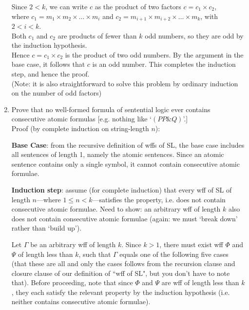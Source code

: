 \documentclass[12pt]{article}
\begin{document}
\begin{enumerate}
Since $2 < k$, we can write $c$ as the product of two factors $c = c_1 \times c_2$, \\
where $c_1 = m_1 \times m_2 \times \ldots \times m_i$ and  $c_2 = m_{i+1} \times m_{i+2} \times \ldots \times m_k$, with $2<i<k$.\\

Both $c_1$ and $c_2$ are products of fewer than $k$ odd numbers, so they are odd by the induction hypothesis.\\

Hence $c = c_1 \times c_2$ is the product of two odd numbers. By the argument in the base case, it follows that $c$ is an odd number. This completes the induction step, and hence the proof. \\

(Note: it is also straightforward to solve this problem by ordinary induction on the number of odd factors)

\newpage

\item Prove that no well-formed formula of sentential logic ever contains consecutive atomic formulas [e.g. nothing like `$(PP\&Q)$'.] \\

Proof (by complete induction on string-length $n$): 

\textbf{Base Case}: from the recursive definition of wffs of SL, the base case includes all sentences of length 1, namely the atomic sentences. Since an atomic sentence contains only a single symbol, it cannot contain consecutive atomic formulae.

\textbf{Induction step}: assume (for complete induction) that every wff of SL of length $n$---where $1 \leq n < k$---satisfies the property, i.e. does not contain consecutive atomic formulae. Need to show: an arbitrary wff of length $k$ also does not contain consecutive atomic formulae (again: we must `break down' rather than `build up').

Let $\Gamma$ be an arbitrary wff of length $k$. Since $k > 1$, there must exist wff $\Phi$ and $\Psi$ of length less than $k$, such that $\Gamma$ equals one of the following five cases (that these are all and only the cases follows from the recursion clause and closure clause of our definition of ``wff of SL", but you don't have to note that). Before proceeding, note that since $\Phi$ and $\Psi$ are wff of length less than $k$, they each satisfy the relevant property by the induction hypothesis (i.e. neither contains consecutive atomic formulae).


\end{enumerate}
\end{document}
